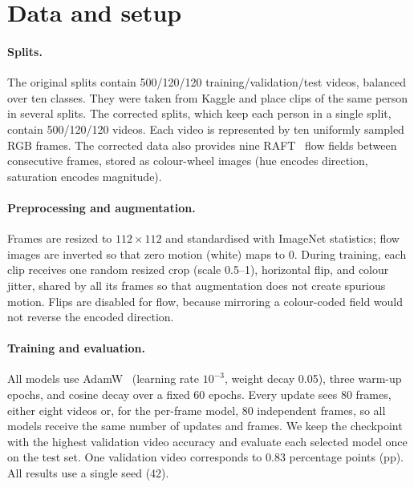 \section{Data and setup}
\label{sec:data}
\paragraph{Splits.}
The original splits contain 500/120/120 training/validation/test videos, balanced over
ten classes. They were taken from Kaggle and place clips of the same person
in several splits. The corrected splits, which keep each person in a single
split, contain 500/120/120 videos. Each video is represented by ten
uniformly sampled RGB frames. The corrected data also provides nine
RAFT~\cite{teed2020raft} flow fields between consecutive frames, stored as
colour-wheel images (hue encodes direction, saturation encodes magnitude).

\paragraph{Preprocessing and augmentation.}
Frames are resized to $112{\times}112$ and standardised with ImageNet
statistics; flow images are inverted so that zero motion (white) maps to 0.
During training, each clip receives one random resized crop (scale
0.5--1), horizontal flip, and colour jitter, shared by all its frames so
that augmentation does not create spurious motion. Flips are disabled for
flow, because mirroring a colour-coded field would not reverse the encoded
direction.

\paragraph{Training and evaluation.}
All models use AdamW~\cite{loshchilov2019adamw} (learning rate $10^{-3}$,
weight decay 0.05), three warm-up epochs, and cosine decay over a fixed
60 epochs. Every update sees 80 frames, either eight videos or, for the
per-frame model, 80 independent frames, so all models receive the same
number of updates and frames. We keep the checkpoint with the highest
validation video accuracy and evaluate each selected model once on the
test set. One validation video corresponds to 0.83 percentage points (pp).
All results use a single seed (42).
